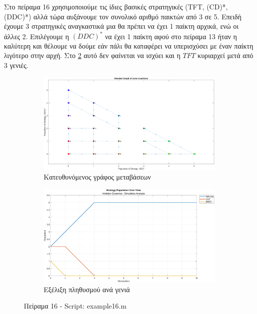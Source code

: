 \documentclass[12pt]{report}
\begin{document}
Στο πείραμα 16 χρησιμοποιούμε τις ίδιες βασικές στρατηγικές (\foreignlanguage{english}{TFT, (CD)*, (DDC)*}) αλλά τώρα αυξάνουμε τον συνολικό αριθμό παικτών από 3 σε 5. Επειδή έχουμε 3 στρατηγικές αναγκαστικά μια θα πρέπει να έχει 1 παίκτη αρχικά, ενώ οι άλλες 2. Επιλέγουμε η $(DDC)^*$ να έχει 1 παίκτη αφού στο πείραμα 13 ήταν η καλύτερη και θέλουμε να δούμε εάν πάλι θα καταφέρει να υπερισχύσει με έναν παίκτη λιγότερο στην αρχή. Στο \ref{fig:fig16-sim} αυτό δεν φαίνεται να ισχύει και η $TFT$ κυριαρχεί μετά από 3 γενιές.
\begin{figure}[H]
    \centering

    \begin{subfigure}[b]{0.45\textwidth}
        \includegraphics[width=\linewidth]{Figures Imitation Dynamics/example16.png}
        \caption{Κατευθυνόμενος γράφος μεταβάσεων}
        \label{fig:fig16}
    \end{subfigure}
    \hfill
    \begin{subfigure}[b]{0.45\textwidth}
        \includegraphics[width=\linewidth]{Figures Imitation Dynamics/example16-sim.png}
        \caption{Εξέλιξη πληθυσμού ανά γενιά}
        \label{fig:fig16-sim}
    \end{subfigure}

    \caption{Πείραμα 16 - \foreignlanguage{english}{Script: example16.m}}
    \label{fig:example16}
\end{figure}
\end{document}
